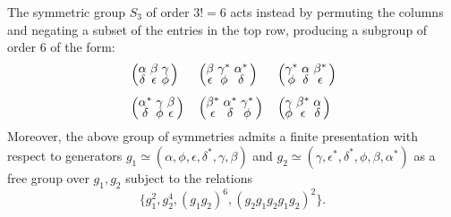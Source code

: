 \documentclass[notitlepage, 10pt]{article}
\begin{document}
\begin{rem}
\begin{equation}
    \end{equation}
    The symmetric group $S_3$ of order $3! = 6$ acts instead by permuting the columns and negating a subset of the entries in the top row, producing a subgroup of order $6$ of the form:
    \begin{equation}
        \begin{alignedat}{3}
            &\left(\tightsextuple{\alpha & \beta & \gamma \\ \delta & \epsilon & \phi}\right)
            \quad
            &&\left(\tightsextuple{\beta & \gamma^* & \alpha^* \\ \epsilon & \phi & \delta}\right)
            \quad
            &&\left(\tightsextuple{\gamma^* & \alpha & \beta^*  \\ \phi & \delta & \epsilon }\right)\\[0.5em]
            &\left(\tightsextuple{\alpha^* & \gamma & \beta \\ \delta & \phi & \epsilon}\right)
            \quad
            &&\left(\tightsextuple{\beta^* & \alpha^*  & \gamma^* \\ \epsilon & \delta & \phi}\right)
            \quad
            &&\left(\tightsextuple{\gamma & \beta^* & \alpha \\ \phi & \epsilon & \delta}\right)\\
        \end{alignedat}
    \end{equation}
    Moreover, the above group of symmetries admits a finite presentation with respect to generators $g_1 \simeq (\alpha, \phi, \epsilon, \delta^{*}, \gamma, \beta)$ and $g_2 \simeq (\gamma, \epsilon^*, \delta^{*}, \phi, \beta, \alpha^*)$ as a free group over $g_1, g_2$ subject to the relations
    \begin{equation}
        \{ g_1^2, g_2^4, (g_1 g_2)^6, (g_2g_1g_2g_1g_2)^2 \}.
    \end{equation}
\end{rem}
\end{document}
